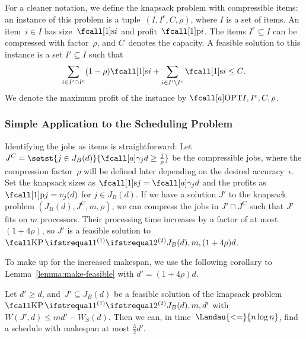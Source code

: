 For a cleaner notation, we define the knapsack problem with compressible items:
an instance of this problem is a tuple~$(I, I^\mathrm{c}, C, \rho)$,
where $I$ is a set of items.
An item~$i \in I$ has size~$\s{i}$ and profit~$\pr{i}$.
The items $I^\mathrm{c} \subseteq I$ can be compressed with factor~$\rho$,
and $C$~denotes the capacity.
A feasible solution to this instance is a set $I' \subseteq I$ such that
\begin{equation}
  \sum_{i \in I' \cap I^\mathrm{c}} (1-\rho) \s{i}
    + \sum_{i \in I' \setminus I^\mathrm{c}} \s{i} \leq C \dpunct{.}
\end{equation}
We denote the maximum profit of the instance by $\KPCOPT{I, I^\mathrm{c}, C, \rho}$.


\subsubsection{Simple Application to the Scheduling Problem}
\label{sec:application}

Identifying the jobs as items is straightforward:
Let~$J^C = \setst{j \in J_B(d)}{\procnum{j}{d} \geq \frac{1}{\rho}}$ be the compressible jobs,
where the compression factor~$\rho$ will be defined later
depending on the desired accuracy~$\epsilon$.
Set the knapsack sizes as $\s{j} = \procnum{j}{d}$ and the profits as $\pr{j} = v_j(d)$ for $j \in J_B(d)$.
If we have a solution $J'$ to the knapsack problem $(J_B(d), J^C, m, \rho)$,
we can compress the jobs in $J' \cap J^C$ such that $J'$ fits on $m$ processors.
Their processing time increases by a factor of at most~$(1+4\rho)$,
so $J'$ is a feasible solution to $\KP{J_B(d)}{m, (1+4\rho)d}$.

To make up for the increased makespan,
we use the following corollary to Lemma~\ref{lemma:make-feasible}
with $d' = (1 + 4\rho)d$.
\begin{corollary}
  \label{thm:approx}
  Let $d' \geq d$, and~$J' \subseteq J_B(d)$
  be a feasible solution of the knapsack problem $\KP{J_B(d)}{m,d'}$
  with~$W(J', d) \leq md' - W_S(d)$.
  Then we can, in time~$\Landau{<=}{n \log n}$,
  find a schedule with makespan at most $\frac{3}{2}d'$.
\end{corollary}

